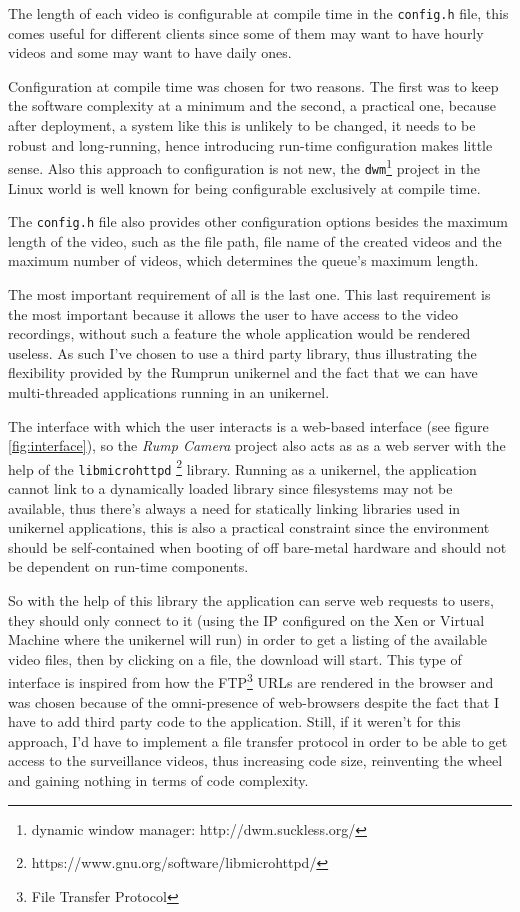 \documentclass[10pt,a4paper,twoside]{article}
\begin{document}
The length of each video is configurable at compile time in the \texttt{config.h} file, this comes
useful for different clients since some of them may want to have hourly videos and some may want to have daily ones.

Configuration at compile time was chosen for two reasons.
The first was to keep the software complexity at a minimum and the second, a practical one,
because after deployment, a system like this is unlikely to be changed, it needs to be robust and long-running,
hence introducing run-time configuration makes little sense. Also this approach to configuration is not new, the
\texttt{dwm}\footnote{dynamic window manager: http://dwm.suckless.org/} project in the Linux world is well known for
being configurable exclusively at compile time.

The \texttt{config.h} file also provides other configuration options besides the maximum length of the video,
such as the file path, file name of the created videos and the maximum number of videos,
which determines the queue's maximum length.

The most important requirement of all is the last one.
This last requirement is the most important because it allows the user to have access to the video recordings,
without such a feature the whole application would be rendered useless.
As such I've chosen to use a third party library, thus illustrating the flexibility provided by the
Rumprun unikernel and the fact that we can have multi-threaded applications running in an unikernel.

The interface with which the user interacts is a web-based interface (see figure \ref{fig:interface}), so the \textit{Rump Camera}
project also acts as as a web server with the help of the \texttt{libmicrohttpd}
\footnote{https://www.gnu.org/software/libmicrohttpd/} library. Running as a unikernel, the application
cannot link to a dynamically loaded library since filesystems may not be available, thus there's always a need for statically linking libraries used in unikernel applications, this is also a practical constraint since
the environment should be self-contained when booting of off bare-metal hardware and should not be dependent
on run-time components.

So with the help of this library the application can serve web requests to users,
they should only connect to it (using the IP configured on the Xen or Virtual Machine where the unikernel will run) in order to get a listing of the available video files, then by clicking on a file, the download will start.
This type of interface is inspired from how the FTP\footnote{File Transfer Protocol}
URLs are rendered in the browser and was chosen because of the omni-presence of
web-browsers despite the fact that I have to add third party code to the application.
Still, if it weren't for this approach, I'd
have to implement a file transfer protocol in order to be able to get access to the surveillance videos, thus
increasing code size, reinventing the wheel and gaining nothing in terms of code complexity.
\end{document}
